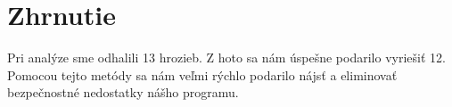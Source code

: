 \section{Zhrnutie}

Pri analýze sme odhalili 13 hrozieb.
Z hoto sa nám úspešne podarilo vyriešiť 12.
Pomocou tejto metódy sa nám veľmi rýchlo podarilo nájsť a eliminovať bezpečnostné nedostatky nášho programu.
